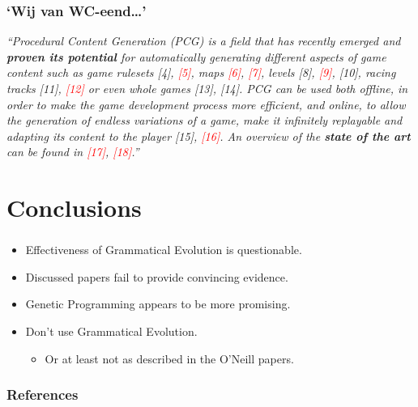 \documentclass{beamer}
\makeatletter
\newcommand*{\currentname}{\@currentlabelname}
\makeatother
\begin{document}
\begin{frame}
\frametitle{`Wij van WC-eend\ldots'}
\textit{``Procedural Content Generation (PCG) is a field that has
recently emerged and \textbf{proven its potential} for automatically
generating different aspects of game content such as game
rulesets [4], \textcolor<2>{red}{[5]}, maps \textcolor<2>{red}{[6]}, \textcolor<2>{red}{[7]}, levels [8], \textcolor<2>{red}{[9]}, [10], racing
tracks [11], \textcolor<2>{red}{[12]} or even whole games [13], [14]. PCG can
be used both offline, in order to make the game development
process more efficient, and online, to allow the generation of
endless variations of a game, make it infinitely replayable and
adapting its content to the player [15], \textcolor<2>{red}{[16]}. An overview of
the \textbf{state of the art} can be found in \textcolor<2>{red}{[17]}, \textcolor<2>{red}{[18]}.''} \cite{shaker2012evolving}
\end{frame}

\section{Conclusions}
\begin{frame}
\frametitle{\currentname}
\begin{itemize}
\item Effectiveness of Grammatical Evolution is questionable.
\item Discussed papers fail to provide convincing evidence.
\item Genetic Programming appears to be more promising.
\vspace*{2em}
\item<2-> Don't use Grammatical Evolution.
\begin{itemize}
\item Or at least not as described in the O'Neill papers.
\end{itemize}
\end{itemize}
\end{frame}

\begin{frame}
\frametitle{References}
\small


\end{frame}
\end{document}
